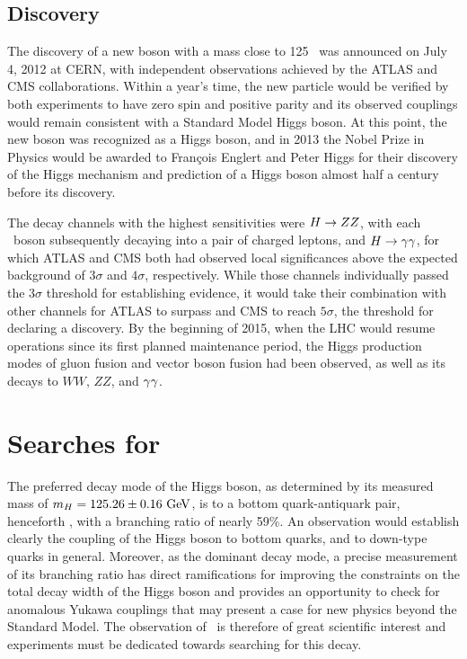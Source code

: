 \subsection{Discovery}

The discovery of a new boson with a mass close to 125 \GeV\ was announced on July 4, 2012 at CERN, with independent observations achieved by the ATLAS\cite{ATLASHiggsDiscovery} and CMS\cite{CMSHiggsDiscovery} collaborations. Within a year's time, the new particle would be verified by both experiments to have zero spin and positive parity\cite{ATLASHiggsVerify,CMSHiggsVerify} and its observed couplings would remain consistent with a Standard Model Higgs boson.\cite{HiggsCouplingConstraints} At this point, the new boson was recognized as a Higgs boson, and in 2013 the Nobel Prize in Physics would be awarded to Fran\c{c}ois Englert and Peter Higgs for their discovery of the Higgs mechanism and prediction of a Higgs boson almost half a century before its discovery.

The decay channels with the highest sensitivities were $H \rightarrow ZZ$, with each \bosZ\ boson subsequently decaying into a pair of charged leptons, and $H \rightarrow \gamma\gamma$, for which ATLAS and CMS both had observed local significances above the expected background of $3\sigma$ and $4\sigma$, respectively. While those channels individually passed the $3\sigma$ threshold for establishing evidence, it would take their combination with other channels for ATLAS to surpass and CMS to reach $5\sigma$, the threshold for declaring a discovery. By the beginning of 2015, when the LHC would resume operations since its first planned maintenance period, the Higgs production modes of gluon fusion and vector boson fusion had been observed, as well as its decays to $WW$, $ZZ$, and $\gamma\gamma$. 

\section{Searches for \VHbb}

The preferred decay mode of the Higgs boson, as determined by its measured mass of $\massH = 125.26 \pm 0.16\ \GeV$\cite{PDG2018}, is to a bottom quark-antiquark pair, henceforth \Hbb, with a branching ratio of nearly 59\%. An observation would establish clearly the coupling of the Higgs boson to bottom quarks, and to down-type quarks in general. Moreover, as the dominant decay mode, a precise measurement of its branching ratio has direct ramifications for improving the constraints on the total decay width of the Higgs boson and provides an opportunity to check for anomalous Yukawa couplings that may present a case for new physics beyond the Standard Model. The observation of \Hbb\ is therefore of great scientific interest and experiments must be dedicated towards searching for this decay.

